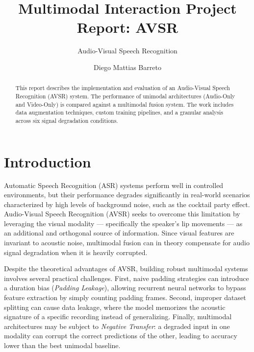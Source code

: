 \documentclass[sigconf,screen,nonacm]{acmart}
\begin{document}
\title{Multimodal Interaction Project Report: AVSR}
\subtitle{Audio-Visual Speech Recognition}

\author{Diego Mattias Barreto}

\begin{abstract}
  This report describes the implementation and evaluation of an Audio-Visual Speech Recognition (AVSR) system. The performance of unimodal architectures (Audio-Only and Video-Only) is compared against a multimodal fusion system. The work includes data augmentation techniques, custom training pipelines, and a granular analysis across six signal degradation conditions.
\end{abstract}

\maketitle

\section{Introduction}

Automatic Speech Recognition (ASR) systems perform well in controlled environments, but their performance degrades significantly in real-world scenarios characterized by high levels of background noise, such as the cocktail party effect. Audio-Visual Speech Recognition (AVSR) seeks to overcome this limitation by leveraging the visual modality --- specifically the speaker's lip movements --- as an additional and orthogonal source of information. Since visual features are invariant to acoustic noise, multimodal fusion can in theory compensate for audio signal degradation when it is heavily corrupted.

Despite the theoretical advantages of AVSR, building robust multimodal systems involves several practical challenges. First, naive padding strategies can introduce a duration bias (\textit{Padding Leakage}), allowing recurrent neural networks to bypass feature extraction by simply counting padding frames. Second, improper dataset splitting can cause data leakage, where the model memorizes the acoustic signature of a specific recording instead of generalizing. Finally, multimodal architectures may be subject to \textit{Negative Transfer}: a degraded input in one modality can corrupt the correct predictions of the other, leading to accuracy lower than the best unimodal baseline.
\end{document}
